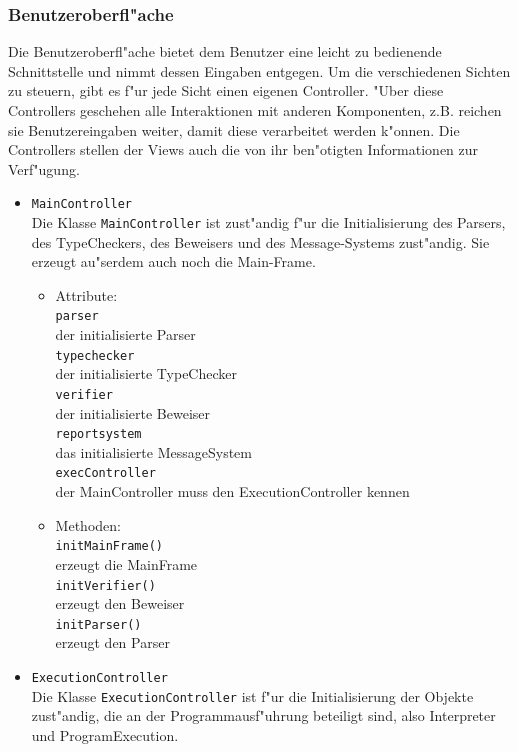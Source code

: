\documentclass[10pt,a4paper,titlepage]{article}
\begin{document}
\subsubsection{Benutzeroberfl"ache}

Die Benutzeroberfl"ache bietet dem Benutzer eine leicht zu bedienende Schnittstelle und nimmt dessen Eingaben entgegen. Um die verschiedenen Sichten zu steuern, gibt es f"ur jede Sicht einen eigenen Controller. "Uber diese Controllers geschehen alle Interaktionen mit anderen Komponenten, z.B. reichen sie Benutzereingaben weiter, damit diese verarbeitet werden k"onnen. Die Controllers stellen der Views auch die von ihr ben"otigten Informationen zur Verf"ugung. 
\begin{itemize}
\item \texttt{MainController} \\
Die Klasse \texttt{MainController} ist zust"andig f"ur die Initialisierung des Parsers, des TypeCheckers, des Beweisers und des Message-Systems zust"andig. Sie erzeugt au"serdem auch noch die Main-Frame.
\begin{itemize}
\item Attribute: \\
\texttt{parser} \\
der initialisierte Parser \\
\texttt{typechecker} \\
der initialisierte TypeChecker \\
\texttt{verifier} \\
der initialisierte Beweiser \\
\texttt{reportsystem} \\
das initialisierte MessageSystem \\
\texttt{execController} \\
der MainController muss den ExecutionController kennen
\item Methoden: \\
\texttt{initMainFrame()} \\
erzeugt die MainFrame \\
\texttt{initVerifier()} \\
erzeugt den Beweiser \\
\texttt{initParser()} \\
erzeugt den Parser 
\end{itemize}
\item \texttt{ExecutionController} \\
Die Klasse \texttt{ExecutionController} ist f"ur die Initialisierung der Objekte zust"andig, die an der Programmausf"uhrung beteiligt sind, also Interpreter und ProgramExecution.

\end{itemize}
\end{document}
